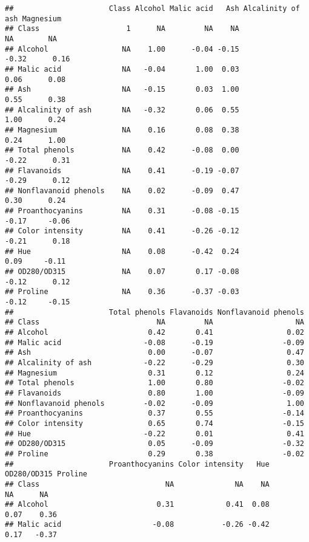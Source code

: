 \documentclass[
]{article}
\begin{document}
\begin{verbatim}
##                      Class Alcohol Malic acid   Ash Alcalinity of ash Magnesium
## Class                    1      NA         NA    NA                NA        NA
## Alcohol                 NA    1.00      -0.04 -0.15             -0.32      0.16
## Malic acid              NA   -0.04       1.00  0.03              0.06      0.08
## Ash                     NA   -0.15       0.03  1.00              0.55      0.38
## Alcalinity of ash       NA   -0.32       0.06  0.55              1.00      0.24
## Magnesium               NA    0.16       0.08  0.38              0.24      1.00
## Total phenols           NA    0.42      -0.08  0.00             -0.22      0.31
## Flavanoids              NA    0.41      -0.19 -0.07             -0.29      0.12
## Nonflavanoid phenols    NA    0.02      -0.09  0.47              0.30      0.24
## Proanthocyanins         NA    0.31      -0.08 -0.15             -0.17     -0.06
## Color intensity         NA    0.41      -0.26 -0.12             -0.21      0.18
## Hue                     NA    0.08      -0.42  0.24              0.09     -0.11
## OD280/OD315             NA    0.07       0.17 -0.08             -0.12      0.12
## Proline                 NA    0.36      -0.37 -0.03             -0.12     -0.15
##                      Total phenols Flavanoids Nonflavanoid phenols
## Class                           NA         NA                   NA
## Alcohol                       0.42       0.41                 0.02
## Malic acid                   -0.08      -0.19                -0.09
## Ash                           0.00      -0.07                 0.47
## Alcalinity of ash            -0.22      -0.29                 0.30
## Magnesium                     0.31       0.12                 0.24
## Total phenols                 1.00       0.80                -0.02
## Flavanoids                    0.80       1.00                -0.09
## Nonflavanoid phenols         -0.02      -0.09                 1.00
## Proanthocyanins               0.37       0.55                -0.14
## Color intensity               0.65       0.74                -0.15
## Hue                          -0.22       0.01                 0.41
## OD280/OD315                   0.05      -0.09                -0.32
## Proline                       0.29       0.38                -0.02
##                      Proanthocyanins Color intensity   Hue OD280/OD315 Proline
## Class                             NA              NA    NA          NA      NA
## Alcohol                         0.31            0.41  0.08        0.07    0.36
## Malic acid                     -0.08           -0.26 -0.42        0.17   -0.37

\end{verbatim}
\end{document}
